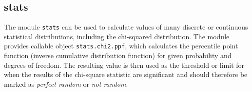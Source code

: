 \documentclass[
  digital, %
  color,   %
  oneside, %
  lof,     %
  nolot,     %
]{fithesis4}
\begin{document}
\subsection{stats}
\label{ssec:stats}
The module \texttt{stats} can be used to calculate values of many discrete\cite{scipydescrete} or continuous\cite{scipycontinuous} statistical distributions, including the chi-squared distribution.
The module provides callable object \texttt{stats.chi2.ppf}, which calculates the percentile point function (inverse cumulative distribution function) for given probability and degrees of freedom.\cite{scipystatschi2}
The resulting value is then used as the threshold or limit for when the results of the chi-square statistic are significant and should therefore be marked as \emph{perfect random} or \emph{not random}.




\end{document}
